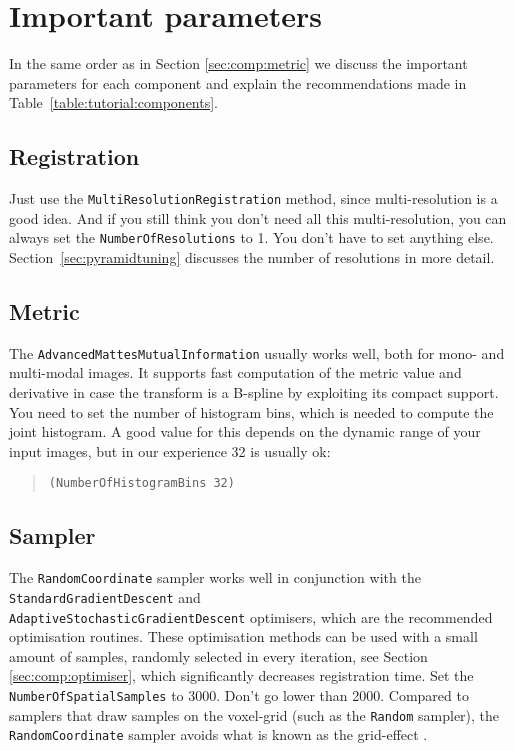 \documentclass[]{report}
\begin{document}
\section{Important parameters}\label{sec:Tutorial:importantparam}

In the same order as in Section \ref{sec:comp:metric} we discuss
the important parameters for each component and explain the
recommendations made in Table~\ref{table:tutorial:components}.

\subsection{Registration}\label{sec:registrationtuning}

Just use the \texttt{MultiResolutionRegistration} method, since
multi-resolution is a good idea. And if you still think you don't
need all this multi-resolution, you can always set the
\texttt{NumberOfResolutions} to 1. You don't have to set anything
else. Section~\ref{sec:pyramidtuning} discusses the number of
resolutions in more detail.

\subsection{Metric}

The \texttt{AdvancedMattesMutualInformation} usually works well,
both for mono- and multi-modal images. It supports fast computation
of the metric value and derivative in case the transform is a
B-spline by exploiting its compact support. You need to set the
number of histogram bins, which is needed to compute the joint
histogram. A good value for this depends on the dynamic range of
your input images, but in our experience 32 is usually ok:
\begin{quote}
\texttt{(NumberOfHistogramBins 32)}
\end{quote}

\subsection{Sampler}\label{sec:samplertuning}

The \texttt{RandomCoordinate} sampler works well in conjunction with
the \texttt{StandardGradientDescent} and\\
\texttt{AdaptiveStochasticGradientDescent} optimisers, which are the
recommended optimisation routines. These optimisation methods can be
used with a small amount of samples, randomly selected in every
iteration, see Section \ref{sec:comp:optimiser}, which significantly
decreases registration time. Set the \texttt{NumberOfSpatialSamples}
to 3000. Don't go lower than 2000. Compared to samplers that draw
samples on the voxel-grid (such as the \texttt{Random} sampler), the
\texttt{RandomCoordinate} sampler avoids what is known as the
grid-effect \citep{The08:Halton}.
\end{document}
